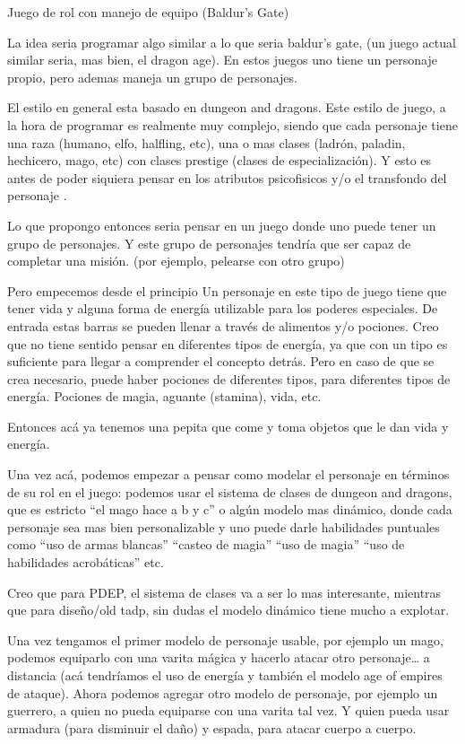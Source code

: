 Juego de rol con manejo de equipo (Baldur’s Gate)

La idea seria programar algo similar a lo que seria baldur’s gate, (un juego actual similar seria, mas bien, el dragon age). 
En estos juegos uno tiene un personaje propio, pero ademas maneja un grupo de personajes. 

El estilo en general esta basado en dungeon and dragons. Este estilo de juego, a la hora de programar 
es realmente muy complejo, siendo que cada personaje tiene una raza (humano, elfo, halfling, etc), 
una o mas clases (ladrón, paladin, hechicero, mago, etc) con clases prestige (clases de especialización). 
Y esto es antes de poder siquiera pensar en los atributos psicofisicos y/o el transfondo del personaje . 

Lo que propongo entonces seria pensar en un juego donde uno puede tener un grupo de personajes. 
Y este grupo de personajes tendría que ser capaz de completar una misión. (por ejemplo, pelearse con otro grupo) 

Pero empecemos desde el principio
Un personaje en este tipo de juego tiene que tener vida y alguna forma de energía utilizable para los poderes
especiales. De entrada estas barras se pueden llenar a través de alimentos y/o pociones. Creo que no tiene sentido
pensar en diferentes tipos de energía, ya que con un tipo es suficiente para llegar a comprender el concepto detrás.
Pero en caso de que se crea necesario, puede haber pociones de diferentes tipos, para diferentes tipos de energía.
Pociones de magia, aguante (stamina), vida, etc.  

Entonces acá ya tenemos una pepita que come y toma objetos que le dan vida y energía.

Una vez acá, podemos empezar a pensar como modelar el personaje en términos de su rol en el juego: podemos
usar el sistema de clases de dungeon and dragons, que es estricto “el mago hace a b y c” o algún modelo mas dinámico,
donde cada personaje sea mas bien personalizable y uno puede darle habilidades puntuales como “uso de armas blancas”
“casteo de magia” “uso de magia” “uso de habilidades acrobáticas” etc.

Creo que para PDEP, el sistema de clases va a ser lo mas interesante, mientras que para diseño/old tadp,
sin dudas el modelo dinámico tiene mucho a explotar. 

Una vez tengamos el primer modelo de personaje usable, por ejemplo un mago, podemos equiparlo con una varita mágica
y hacerlo atacar otro personaje… a distancia (acá tendríamos el uso de energía y también el modelo age of empires
de ataque). Ahora podemos agregar otro modelo de personaje, por ejemplo un guerrero, a quien no pueda equiparse
con una varita tal vez. Y quien pueda usar armadura (para disminuir el daño) y espada, para atacar cuerpo a cuerpo. 

